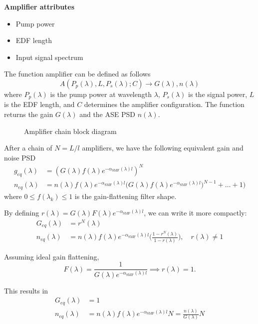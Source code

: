 \documentclass[a4paper]{article}
\begin{document}
\noindent\textbf{Amplifier attributes}
\begin{itemize}
	\item Pump power
	\item EDF length
	\item Input signal spectrum
\end{itemize}

The function amplifier can be defined as follows
\begin{equation}
	A(P_p(\lambda), L, P_s(\lambda); C) \to G(\lambda), n(\lambda)
\end{equation}
where $P_p(\lambda)$ is the pump power at wavelength $\lambda$,  $P_s(\lambda)$ is the signal power, $L$ is the EDF length, and $C$ determines the amplifier configuration. The function returns the gain $G(\lambda)$ and the ASE PSD $n(\lambda)$.

\begin{figure}
	\resizebox{\textwidth}{!}{}
	\caption{Amplifier chain block diagram}
\end{figure}

After a chain of $N = L/l$ amplifiers, we have the following equivalent gain and noise PSD
\begin{align}
	g_{eq}(\lambda) &= (G(\lambda)f(\lambda)e^{-\alpha_{\text{SMF}}(\lambda)l})^N \\
	n_{eq}(\lambda) &= n(\lambda)f(\lambda)e^{-\alpha_{\text{SMF}}(\lambda)l}\Big(G(\lambda)f(\lambda)e^{-\alpha_{\text{SMF}}(\lambda)l})^{N-1}+\ldots+1\Big)
\end{align}
where $0\leq f(\lambda_k) \leq 1$ is the gain-flattening filter shape.

By defining $r(\lambda) = G(\lambda)F(\lambda)e^{-\alpha_{\text{SMF}}(\lambda)l}$, we can write it more compactly:
\begin{align}
G_{eq}(\lambda) &= r^N(\lambda) \\
n_{eq}(\lambda) &= n(\lambda)f(\lambda)e^{-\alpha_{\text{SMF}}(\lambda)l}\Big(\frac{1-r^{N}(\lambda)}{1-r(\lambda)}\Big), \quad r(\lambda)\neq 1
\end{align}

Assuming ideal gain flattening,
\begin{equation}
	F(\lambda) = \frac{1}{G(\lambda)e^{-\alpha_{\text{SMF}}(\lambda)l}} \implies r(\lambda) = 1.
\end{equation}

This results in 
\begin{align}
	G_{eq}(\lambda) &= 1 \\
	n_{eq}(\lambda) &= n(\lambda)f(\lambda)e^{-\alpha_{\text{SMF}}(\lambda)l}N = \frac{n(\lambda)}{G(\lambda)}N
\end{align}
\end{document}
